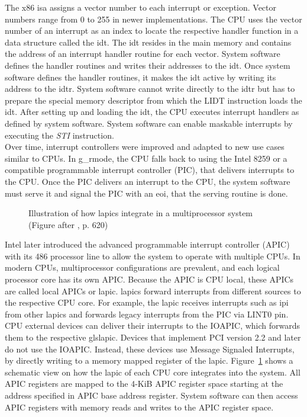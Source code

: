 The x86 \gls{isa} assigns a vector number to each interrupt or exception. Vector
numbers range from 0 to 255 in newer implementations. The CPU uses the vector
number of an interrupt as an index to locate the respective handler function in
a data structure called the \gls{idt}. The \gls{idt} resides in the main memory
and contains the address of an interrupt handler routine for each vector. System
software defines the handler routines and writes their addresses to the
\gls{idt}. Once system software defines the handler routines, it makes the
\gls{idt} active by writing its address to the \gls{idtr}. System software
cannot write directly to the \gls{idtr} but has to prepare the special memory
descriptor from which the LIDT instruction loads the \gls{idt}. After setting up
and loading the \gls{idt}, the CPU executes interrupt handlers as defined by
system software. System software can enable maskable interrupts by executing the
\textit{STI} instruction.\\

Over time, interrupt controllers were improved and adapted to new use cases
similar to CPUs. In \gls{g_rmode}, the CPU falls back to using the Intel 8259 or
a compatible programmable interrupt controller (PIC), that delivers
interrupts to the CPU. Once the PIC delivers an interrupt to the CPU, the system
software must serve it and signal the PIC with an \gls{eoi}, that the serving
routine is done. \\

\begin{figure}
  \begin{center}
    
    \caption{Illustration of how \glspl{lapic} integrate in a
    multiprocessor system (Figure after \cite{amd_manual}, p. 620)}
    \label{fig:state:technical:lapic}
  \end{center}
\end{figure}

Intel later introduced the advanced programmable interrupt controller (APIC)
with its 486 processor line to allow the system to operate with multiple CPUs.
In modern CPUs, multiprocessor configurations are prevalent, and each logical
processor core has its own APIC. Because the APIC is CPU local, these APICs are
called local APICs or \gls{lapic}. \glspl{lapic} forward interrupts from
different sources to the respective CPU core. For example, the \gls{lapic}
receives interrupts such as \gls{ipi} from other \glspl{lapic} and forwards
legacy interrupts from the PIC via LINT0 pin. CPU external devices can deliver
their interrupts to the IOAPIC, which forwards them to the respective
gls{lapic}. Devices that implement PCI version 2.2 and later do not use the
IOAPIC. Instead, these devices use Message Signaled Interrupts, by directly
writing to a memory mapped register of the \gls{lapic}.
Figure~\ref{fig:state:technical:lapic} shows a schematic view on how the
\gls{lapic} of each CPU core integrates into the system. All APIC registers are
mapped to the 4-KiB APIC register space starting at the address specified
in APIC base address register. System software can then access APIC registers
with memory reads and writes to the APIC register space.

